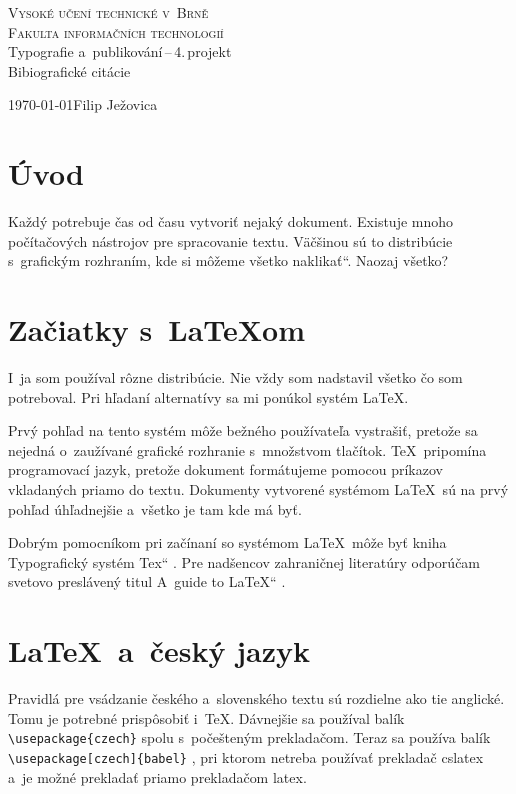 \documentclass[a4paper,11pt]{article}
\newcommand{\myuv}[1]{\quotedblbase #1\textquotedblleft}
\begin{document}
\begin{titlepage}
\begin{center}
{\Huge\textsc{Vysoké učení technické v~Brně}}\\
\bigskip
{\huge\textsc{Fakulta informačních technologií}}\\
{\LARGE Typografie a~publikování\,--\,4.\,projekt}\\
\medskip
{\Huge Bibiografické citácie}\\
\end{center}
{\Large \today \hfill Filip Ježovica}
\end{titlepage}

\section{Úvod}
Každý potrebuje čas od času vytvoriť nejaký dokument.
Existuje mnoho počítačových nástrojov pre spracovanie textu. Väčšinou sú to distribúcie s~grafickým rozhraním, kde si môžeme \myuv{všetko naklikať}. Naozaj všetko?

\section{Začiatky s~\LaTeX om}
I~ja som používal rôzne distribúcie. Nie vždy som nadstavil všetko čo som potreboval. Pri hľadaní alternatívy sa mi ponúkol systém \LaTeX.

Prvý pohľad na tento systém môže bežného používateľa vystrašiť, pretože sa nejedná o~zaužívané grafické rozhranie s~množstvom tlačítok. \TeX \ pripomína programovací jazyk, pretože dokument formátujeme pomocou príkazov vkladaných priamo do textu.\cite{CSTUG}
Dokumenty vytvorené systémom \LaTeX \ sú na prvý pohľad úhľadnejšie a~všetko je tam kde má byť.

Dobrým pomocníkom pri začínaní so systémom \LaTeX \ môže byť kniha \myuv{Typografický systém Tex} \cite{Olsak:SystemTex}. Pre nadšencov zahraničnej literatúry odporúčam  svetovo preslávený titul \myuv{A~guide to \LaTeX} \cite{Helmut:LatexGuide}.

\section{\LaTeX \ a~český jazyk}
Pravidlá pre vsádzanie českého a~slovenského textu sú rozdielne ako tie anglické.
Tomu je potrebné prispôsobiť i~\TeX.
Dávnejšie sa používal balík \verb|\usepackage{czech}| spolu s~počešteným prekladačom.
Teraz sa používa balík \verb|\usepackage[czech]{babel}| , pri ktorom netreba používať prekladač cslatex a~je možné prekladať priamo prekladačom latex.\cite{CZLATEX}
\end{document}
